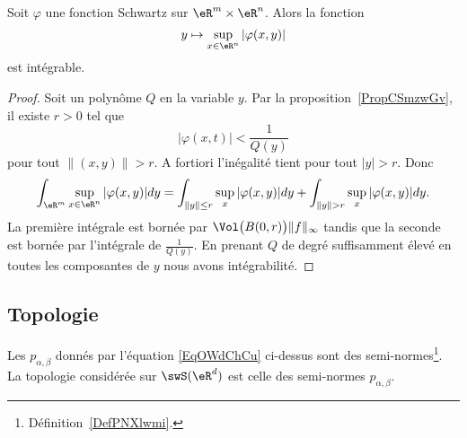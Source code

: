 \begin{corollary}        \label{CORooZFPSooHCFUSH}
    Soit \( \varphi\) une fonction Schwartz sur \( \eR^m\times \eR^n\). Alors la fonction
    \begin{equation}
        y\mapsto \sup_{x\in \eR^n}| \varphi(x,y) |
    \end{equation}
    est intégrable.
\end{corollary}

\begin{proof}
    Soit un polynôme \( Q\) en la variable \( y\). Par la proposition~\ref{PropCSmzwGv}, il existe \( r>0\) tel que
    \begin{equation}
        | \varphi(x,t) |<\frac{1}{ Q(y) }
    \end{equation}
    pour tout \( \| (x,y) \|>r\). A fortiori l'inégalité tient pour tout \( | y |>r\). Donc
    \begin{equation}
        \int_{\eR^m}\sup_{x\in \eR^n}| \varphi(x,y) |dy=\int_{\| y \|\leq r}\sup_{x}| \varphi(x,y) |dy+\int_{ \| y \|>r  }\sup_{x}| \varphi(x,y) |dy.
    \end{equation}
    La première intégrale est bornée par \( \Vol\big( B(0,r) \big)\| f \|_{\infty}\) tandis que la seconde est bornée par l'intégrale de \( \frac{1}{ Q(y) }\). En prenant \( Q\) de degré suffisamment élevé en toutes les composantes de \( y\) nous avons intégrabilité.
\end{proof}

\subsection{Topologie}

\begin{lemmaDef}        \label{LEMDEFooZEFVooMMmiBr}
    Les \( p_{\alpha,\beta}\) donnés par l'équation \eqref{EqOWdChCu} ci-dessus sont des semi-normes\footnote{Définition~\ref{DefPNXlwmi}.}. La topologie considérée sur \( \swS(\eR^d)\) est celle des semi-normes \( p_{\alpha,\beta}\).
\end{lemmaDef}

